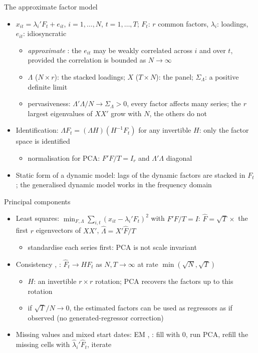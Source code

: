 \begin{frame}{The approximate factor model}
\itemsize{\small}
\begin{itemize}
    \item $x_{it} = \lambda_i'F_t + e_{it}$, $i = 1, \dots, N$, $t = 1, \dots, T$; $F_t$: $r$ common factors, $\lambda_i$: loadings, $e_{it}$: idiosyncratic
    \begin{itemize}
        \item \emph{approximate} : the $e_{it}$ may be weakly correlated across $i$ and over $t$, provided the correlation is bounded as $N \to \infty$
        \item $\Lambda$ ($N\times r$): the stacked loadings; $X$ ($T\times N$): the panel; $\Sigma_\Lambda$: a positive definite limit
        \item pervasiveness: $\Lambda'\Lambda/N \to \Sigma_\Lambda > 0$, every factor affects many series; the $r$ largest eigenvalues of $XX'$ grow with $N$, the others do not
    \end{itemize}
    \item Identification: $\Lambda F_t = (\Lambda H)(H^{-1}F_t)$ for any invertible $H$: only the factor space is identified
    \begin{itemize}
        \item normalisation for PCA: $F'F/T = I_r$ and $\Lambda'\Lambda$ diagonal
    \end{itemize}
    \item Static form of a dynamic model: lags of the dynamic factors are stacked in $F_t$ ; the generalised dynamic model works in the frequency domain 
\end{itemize}
\end{frame}

\begin{frame}{Principal components}
\itemsize{\small}
\begin{itemize}
    \item Least squares: $\min_{F, \Lambda}\sum_{i,t}(x_{it} - \lambda_i'F_t)^2$ with $F'F/T = I$: $\hat F = \sqrt T\times$ the first $r$ eigenvectors of $XX'$, $\hat\Lambda = X'\hat F/T$
    \begin{itemize}
        \item standardise each series first: PCA is not scale invariant
    \end{itemize}
    \item Consistency , : $\hat F_t \to HF_t$ as $N, T \to \infty$ at rate $\min(\sqrt N, \sqrt T)$
    \begin{itemize}
        \item $H$: an invertible $r\times r$ rotation; PCA recovers the factors up to this rotation
        \item if $\sqrt T/N \to 0$, the estimated factors can be used as regressors as if observed (no generated-regressor correction)
    \end{itemize}
    \item Missing values and mixed start dates: EM , : fill with 0, run PCA, refill the missing cells with $\hat\lambda_i'\hat F_t$, iterate
\end{itemize}
\end{frame}

